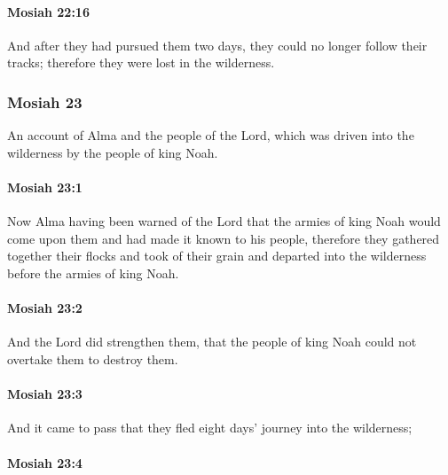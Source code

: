 		\paragraph{Mosiah 22:16} %
			\label{MOSIAH-22-16}

			And after they had pursued them two days,
			they could no longer follow their tracks;
			therefore they were lost in the wilderness.

	\subsubsection{Mosiah 23} %
		\label{MOSIAH-23}
		
		An account of Alma and the people of the Lord,
		which was driven into the wilderness by the people of king Noah.
		
		\paragraph{Mosiah 23:1} %
			\label{MOSIAH-23-1}

			Now Alma having been warned of the Lord
			that the armies of king Noah would come upon them
			and had made it known to his people,
			therefore they gathered together their flocks and took of their grain
			and departed into the wilderness before the armies of king Noah.

		\paragraph{Mosiah 23:2} %
			\label{MOSIAH-23-2}

			And the Lord did strengthen them,
			that the people of king Noah could not overtake them to destroy them.

		\paragraph{Mosiah 23:3} %
			\label{MOSIAH-23-3}

			And it came to pass that
			they fled eight days' journey into the wilderness;

		\paragraph{Mosiah 23:4} %
			\label{MOSIAH-23-4}

